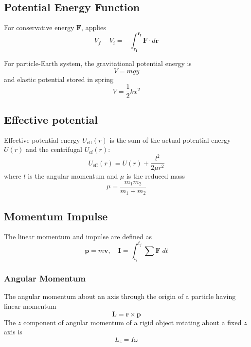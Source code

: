 \documentclass[../../../main.tex]{subfiles}
\begin{document}
\subsection{Potential Energy Function}
For conservative energy $\mathbf{F}$, applies
\begin{equation*}
    V_f-V_i=-\int_{\mathbf{r_i}}^{\mathbf{r_f}}\mathbf{F}\cdot d\mathbf{r}
\end{equation*}

For particle-Earth system, the gravitational potential energy is
\begin{equation*}
    V=mgy
\end{equation*}
and elastic potential stored in spring
\begin{equation*}
    V=\frac{1}{2}kx^2
\end{equation*}

\subsection{Effective potential}
Effective potential energy $U_\text{eff} (r)$ is the sum of the actual potential energy $U(r)$ and the centrifugal $U_\text{cf} (r)$:
\begin{equation*}
    U_\text{eff} (r)=U(r)+\frac{l^2}{2\mu r^2}
\end{equation*}
where $l$ is the angular momentum and $\mu$ is the reduced mass
\begin{equation*}
    \mu=\frac{m_1m_2}{m_1+m_2}
\end{equation*}

\subsection{Momentum Impulse}
The linear momentum and impulse are defined as 
\begin{equation*}
    \mathbf{p}=m\mathbf{v},\quad \mathbf{I}=\int_{t_i}^{t_f}\sum \mathbf{F}\;dt
\end{equation*}

\subsubsection{Angular Momentum} 
The angular momentum about an axis through the origin of a particle having linear momentum
\begin{equation*}
    \mathbf{L}=\mathbf{r}\times \mathbf{p}
\end{equation*}
The $z$ component of angular momentum of a rigid object rotating about a fixed $z$ axis is
\begin{equation*}
    L_z=I\omega
\end{equation*}
\end{document}
